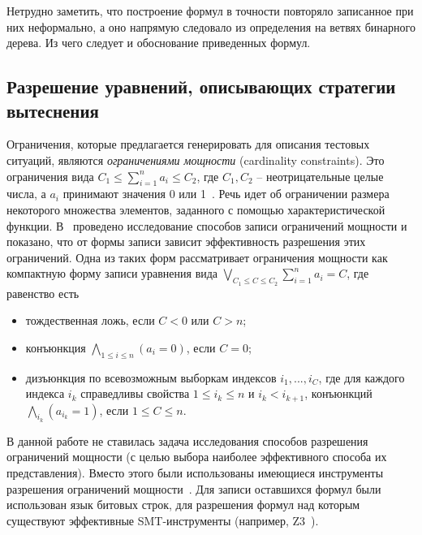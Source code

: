 
Нетрудно заметить, что построение формул в точности повторяло записанное при них неформально, а оно напрямую следовало из определения \PseudoLRU на ветвях бинарного дерева. Из чего следует и обоснование приведенных формул.


\subsection{Разрешение уравнений, описывающих стратегии вытеснения}

Ограничения, которые предлагается генерировать для описания тестовых ситуаций,
являются \emph{ограничениями мощности} (cardinality constraints). Это
ограничения вида $C_1 \leqslant \sum_{i=1}^n a_i \leqslant C_2$, где $C_1, C_2$
-- неотрицательные целые числа, а $a_i$ принимают значения 0 или
1~\cite{smt_debugging, PiskacK08, KuncakR07,
Revesz05}. Речь идет об ограничении размера некоторого множества
элементов, заданного с помощью характеристической функции.
В~\cite{smt_debugging} проведено исследование способов записи
ограничений мощности и показано, что от формы записи зависит
эффективность разрешения этих ограничений. Одна из таких форм рассматривает ограничения
мощности как компактную форму записи уравнения
вида $\bigvee_{C_1 \leqslant C \leqslant C_2} \sum_{i=1}^n a_i = C$,
где равенство есть
\begin{itemize}
\item тождественная ложь, если $C < 0$ или $C > n$;
\item конъюнкция $\bigwedge_{1\leqslant i\leqslant n} (a_i = 0)$,
если $C = 0$;
\item дизъюнкция по всевозможным выборкам индексов $i_1, ..., i_C$, где
для каждого индекса $i_k$ справедливы свойства $1 \leqslant i_k
\leqslant n$ и $i_k < i_{k+1}$, конъюнкций $\bigwedge_{i_k} (a_{i_k}
= 1)$, если $1 \leqslant C \leqslant n$.
\end{itemize}

В данной работе не ставилась задача исследования способов разрешения ограничений
мощности (с целью выбора наиболее эффективного способа их представления). Вместо
этого были использованы
имеющиеся инструменты разрешения ограничений мощности~\cite{Z3, Yices}. Для
записи оставшихся формул были использован язык битовых строк, для разрешения
формул над которым существуют эффективные SMT-инструменты (например,
Z3~\cite{Z3}).

